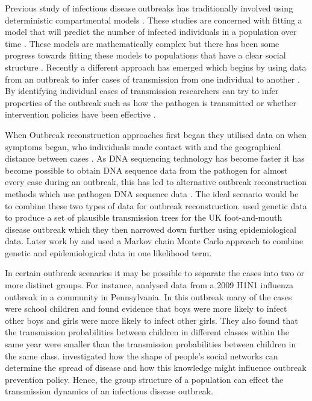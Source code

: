 \documentclass[11pt,a4paper]{report}
\begin{document}
Previous study of infectious disease outbreaks has traditionally involved using deterministic compartmental models \citep{Anderson92}. These studies are concerned with fitting a model that will predict the number of infected individuals in a population over time \citep{Breban07}. These models are mathematically complex but there has been some progress towards fitting these models to populations that have a clear social structure \citep{Ball01}. Recently a different approach has emerged which begins by using data from an outbreak to infer cases of transmission from one individual to another \citep{Teunis13,outbrkr}. By identifying individual cases of transmission researchers can try to infer properties of the outbreak such as how the pathogen is transmitted \citep{Ypmawind} or whether intervention policies have been effective \citep{Ferguson01}.

When Outbreak reconstruction approaches first began they utilised data on when symptoms began, who individuals made contact with and the geographical distance between cases \citep{Haydon03,Ferguson01}. As DNA sequencing technology has become faster \citep{Koser12} it has become possible to obtain DNA sequence data from the pathogen for almost every case during an outbreak, this has led to alternative outbreak reconstruction methods which use pathogen DNA sequence data \citep{Snitkin12}. The ideal scenario would be to combine these two types of data for outbreak reconstruction. \citet{Cottam08} used genetic data to produce a set of plausible transmission trees for the UK foot-and-mouth disease outbreak which they then narrowed down further using epidemiological data. Later work by \citet{Ypma12} and \citet{Morelli12} used a Markov chain Monte Carlo approach to combine genetic and epidemiological data in one likelihood term.

In certain outbreak scenarios it may be possible to separate the cases into two or more distinct groups. For instance, \citet{Cauchemez11} analysed data from a 2009 H1N1 influenza outbreak in a community in Pennsylvania. In this outbreak many of the cases were school children and \citet{Cauchemez11} found evidence that boys were more likely to infect other boys and girls were more likely to infect other girls. They also found that the transmission probabilities between children in different classes within the same year were smaller than the transmission probabilities between children in the same class. \citet{Eubank04} investigated how the shape of people's social networks can determine the spread of disease and how this knowledge might influence outbreak prevention policy. Hence, the group structure of a population can effect the transmission dynamics of an infectious disease outbreak.
\end{document}
